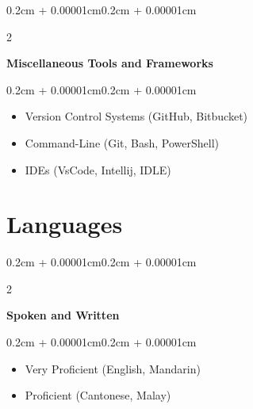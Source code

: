 \documentclass[10pt, letterpaper]{article}
\newenvironment{highlights}{
    \begin{itemize}[
        topsep=0.10cm,
        parsep=0.10cm,
        partopsep=0pt,
        itemsep=0pt,
        leftmargin=0.4cm + 10pt
    ]
}{
    \end{itemize}
}
\newenvironment{onecolentry}{
    \begin{adjustwidth}{0.2cm + 0.00001cm}{0.2cm + 0.00001cm}
}{
    \end{adjustwidth}
}
\newenvironment{twocolentry}[2][]{
    \onecolentry
    \def\secondColumn{#2}
    \setcolumnwidth{\fill, 5.2cm}
    \begin{paracol}{2}
}{
    \switchcolumn \raggedleft \secondColumn
    \end{paracol}
    \endonecolentry
}
\newenvironment{projectentry}{
    \needspace{2.5\baselineskip}
}{
}
\newenvironment{firstprojectentry}{
    \needspace{2\baselineskip}
}{
}
\begin{document}
    \begin{projectentry}
    \begin{twocolentry}{
        \textit{}
    }
        \textbf{Miscellaneous Tools and Frameworks}
    \end{twocolentry}
    \vspace{0.10cm}
    \begin{onecolentry}
        \begin{highlights}
            \item Version Control Systems (GitHub, Bitbucket)
            \item Command-Line (Git, Bash, PowerShell)
            \item IDEs (VsCode, Intellij, IDLE)
        \end{highlights}
    \end{onecolentry}
    \end{projectentry}

    \section{Languages}

    \begin{firstprojectentry}
    \begin{twocolentry}{
        \textit{}
    }
        \textbf{Spoken and Written}
    \end{twocolentry}
    \vspace{0.10cm}
    \begin{onecolentry}
        \begin{highlights}
            \item Very Proficient (English, Mandarin)
            \item Proficient (Cantonese, Malay)
        \end{highlights}
    \end{onecolentry}
    \end{firstprojectentry}
\end{document}
